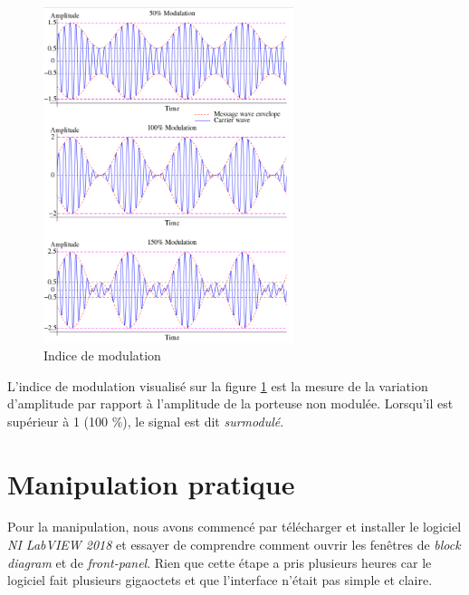 \documentclass[a4paper]{article}
\begin{document}
\begin{figure}[H]
    \centering
    \includegraphics[width=0.65\textwidth]{images/modulation-th-01.PNG}
    \caption{Indice de modulation}
    \label{indiceModulation}
\end{figure}

L'indice de modulation visualisé sur la figure \ref{indiceModulation} est la mesure de la variation d'amplitude par rapport à l'amplitude de la porteuse non modulée. Lorsqu'il est supérieur à 1 (100 \%), le signal est dit \textit{surmodulé}.













\section{Manipulation pratique}





Pour la manipulation, nous avons commencé par télécharger et installer le logiciel \textit{NI LabVIEW 2018} et essayer de comprendre comment ouvrir les fenêtres de \textit{block diagram} et de \textit{front-panel}. Rien que cette étape a pris plusieurs heures car le logiciel fait plusieurs gigaoctets et que l'interface n'était pas simple et claire.
\end{document}
